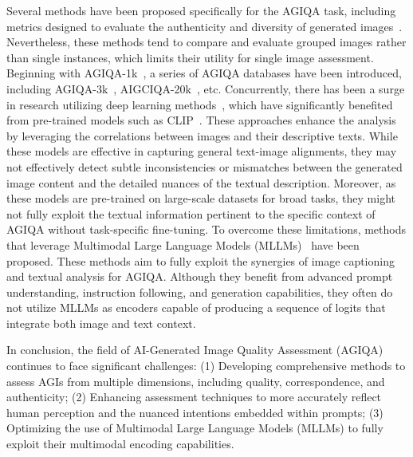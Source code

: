 Several methods have been proposed specifically for the AGIQA task, including metrics designed to evaluate the authenticity and diversity of generated images~\cite{gulrajani2017improved,heusel2017gans}. 
Nevertheless, these methods tend to compare and evaluate grouped images rather than single instances, which limits their utility for single image assessment.
Beginning with AGIQA-1k~\cite{zhang2023perceptual}, a series of AGIQA databases have been introduced, including AGIQA-3k~\cite{li2023agiqa}, AIGCIQA-20k~\cite{li2024aigiqa}, etc.
Concurrently, there has been a surge in research utilizing deep learning methods~\cite{zhou2024adaptive,peng2024aigc,yu2024sf}, which have significantly benefited from pre-trained models such as CLIP~\cite{radford2021learning}. 
These approaches enhance the analysis by leveraging the correlations between images and their descriptive texts.
While these models are effective in capturing general text-image alignments, they may not effectively detect subtle inconsistencies or mismatches between the generated image content and the detailed nuances of the textual description.
Moreover, as these models are pre-trained on large-scale datasets for broad tasks, they might not fully exploit the textual information pertinent to the specific context of AGIQA without task-specific fine-tuning.
To overcome these limitations, methods that leverage Multimodal Large Language Models (MLLMs)~\cite{wang2024large,wang2024understanding} have been proposed.
These methods aim to fully exploit the synergies of image captioning and textual analysis for AGIQA.
Although they benefit from advanced prompt understanding, instruction following, and generation capabilities, they often do not utilize MLLMs as encoders capable of producing a sequence of logits that integrate both image and text context.

In conclusion, the field of AI-Generated Image Quality Assessment (AGIQA) continues to face significant challenges: 
(1) Developing comprehensive methods to assess AGIs from multiple dimensions, including quality, correspondence, and authenticity; 
(2) Enhancing assessment techniques to more accurately reflect human perception and the nuanced intentions embedded within prompts; 
(3) Optimizing the use of Multimodal Large Language Models (MLLMs) to fully exploit their multimodal encoding capabilities.

